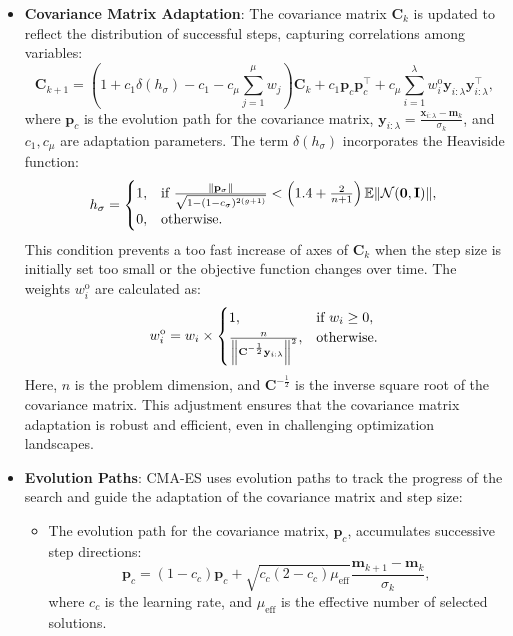 \begin{itemize}
    \item \textbf{Covariance Matrix Adaptation}: The covariance matrix \(\mathbf{C}_k\) is updated to reflect the distribution of successful steps, capturing correlations among variables:
    \begin{equation}
    \mathbf{C}_{k+1} = (1 + c_1 \delta(h_\sigma) - c_1 - c_\mu \sum_{j=1}^\mu w_j) \mathbf{C}_k + c_1 \mathbf{p}_c \mathbf{p}_c^\top + c_\mu \sum_{i=1}^\lambda w_i^\text{o} \mathbf{y}_{i:\lambda} \mathbf{y}_{i:\lambda}^\top,
    \end{equation}
    where \(\mathbf{p}_c\) is the evolution path for the covariance matrix, \(\mathbf{y}_{i:\lambda} = \frac{\mathbf{x}_{i:\lambda} - \mathbf{m}_k}{\sigma_k}\), and \(c_1, c_\mu\) are adaptation parameters. The term \(\delta(h_\sigma)\) incorporates the Heaviside function:
    \begin{equation}
    h_\sigma = 
    \begin{cases}
    1, & \text{if } \frac{\norm{\mathbf{p}_\sigma}}{\sqrt{1 - (1 - c_\sigma)^{2(g+1)}}} < \left(1.4 + \frac{2}{n+1}\right) \mathbb{E} \norm{\mathcal{N}(\mathbf{0}, \mathbf{I})}, \\
    0, & \text{otherwise}.
    \end{cases}
    \end{equation}
    This condition prevents a too fast increase of axes of \(\mathbf{C}_k\) when the step size is initially set too small or the objective function changes over time. The weights \(w_i^\text{o}\) are calculated as:  
    \begin{equation}
    w_i^\text{o} = w_i \times 
    \begin{cases} 
    1, & \text{if } w_i \geq 0, \\ 
    \frac{n}{\norm{\mathbf{C}^{-\frac{1}{2}} \mathbf{y}_{i:\lambda}}^2}, & \text{otherwise}.
    \end{cases}
    \end{equation}
    Here, \(n\) is the problem dimension, and \(\mathbf{C}^{-\frac{1}{2}}\) is the inverse square root of the covariance matrix. This adjustment ensures that the covariance matrix adaptation is robust and efficient, even in challenging optimization landscapes.

    
    \item \textbf{Evolution Paths}: CMA-ES uses evolution paths to track the progress of the search and guide the adaptation of the covariance matrix and step size:
    \begin{itemize}
        \item The evolution path for the covariance matrix, \(\mathbf{p}_c\), accumulates successive step directions:
        \begin{equation}
        \mathbf{p}_c = (1 - c_c) \mathbf{p}_c + \sqrt{c_c (2 - c_c) \mu_\text{eff}} \frac{\mathbf{m}_{k+1} - \mathbf{m}_k}{\sigma_k},
        \end{equation}
        where \(c_c\) is the learning rate, and \(\mu_\text{eff}\) is the effective number of selected solutions.
        

\end{itemize}
\end{itemize}
